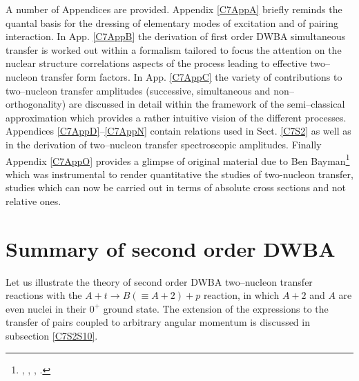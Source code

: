 A number of Appendices are provided. Appendix \ref{C7AppA} briefly reminds the quantal basis for the dressing of elementary modes of excitation and of pairing interaction. In  App. \ref{C7AppB} 	 the derivation of first order DWBA simultaneous transfer is worked out within a formalism tailored to focus the attention on the nuclear structure correlations aspects of the process leading to effective two--nucleon transfer form factors. In App. \ref{C7AppC}  the variety of  contributions to  two--nucleon transfer  amplitudes (successive, simultaneous and non--orthogonality) are discussed in detail within the framework of the semi--classical approximation which provides a rather intuitive vision of the different processes.  Appendices \ref{C7AppD}--\ref{C7AppN} contain relations used in Sect. \ref{C7S2} as well as in the derivation of two--nucleon transfer spectroscopic amplitudes. Finally Appendix \ref{C7AppO} provides a glimpse of original material due to Ben Bayman\footnote{\cite{Bayman:67}, \cite{Bayman:70}, \cite{Bayman:71}, \cite{Bayman:82}.} which was instrumental to render quantitative the studies of two-nucleon transfer, studies which can now be carried out in terms of absolute cross sections and not relative ones.
\section{Summary of second order DWBA}\label{C7S1}
Let us illustrate the  theory of second order DWBA two--nucleon transfer reactions  with the  $A+t \rightarrow B(\equiv A+2)+p$ reaction, in which $A+2$ and $A$ are even nuclei in their $0^+$ ground state. The extension of the  expressions to the transfer of pairs coupled to arbitrary angular momentum is discussed in subsection \ref{C7S2S10}. 



